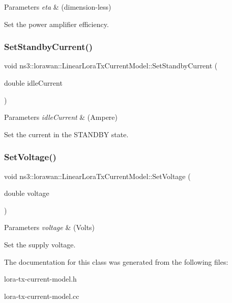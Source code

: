 \begin{DoxyParams}{Parameters}
{\em eta} & (dimension-\/less)\\
\hline
\end{DoxyParams}
Set the power amplifier efficiency. \mbox{\label{classns3_1_1lorawan_1_1LinearLoraTxCurrentModel_a1685530e7d61367adfab611f724f95ce}} 
\subsubsection{\texorpdfstring{Set\+Standby\+Current()}{SetStandbyCurrent()}}
{\footnotesize\ttfamily void ns3\+::lorawan\+::\+Linear\+Lora\+Tx\+Current\+Model\+::\+Set\+Standby\+Current (\begin{DoxyParamCaption}\item[{double}]{idle\+Current }\end{DoxyParamCaption})}


\begin{DoxyParams}{Parameters}
{\em idle\+Current} & (Ampere)\\
\hline
\end{DoxyParams}
Set the current in the S\+T\+A\+N\+D\+BY state. \mbox{\label{classns3_1_1lorawan_1_1LinearLoraTxCurrentModel_a675cff436187a271b78832f938b1d404}} 
\subsubsection{\texorpdfstring{Set\+Voltage()}{SetVoltage()}}
{\footnotesize\ttfamily void ns3\+::lorawan\+::\+Linear\+Lora\+Tx\+Current\+Model\+::\+Set\+Voltage (\begin{DoxyParamCaption}\item[{double}]{voltage }\end{DoxyParamCaption})}


\begin{DoxyParams}{Parameters}
{\em voltage} & (Volts)\\
\hline
\end{DoxyParams}
Set the supply voltage. 

The documentation for this class was generated from the following files\+:\begin{DoxyCompactItemize}
\item 
lora-\/tx-\/current-\/model.\+h\item 
lora-\/tx-\/current-\/model.\+cc\end{DoxyCompactItemize}
